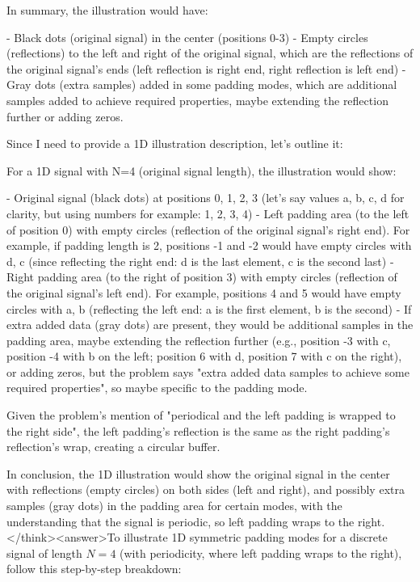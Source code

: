 In summary, the illustration would have:

- Black dots (original signal) in the center (positions 0-3)
- Empty circles (reflections) to the left and right of the original signal, which are the reflections of the original signal's ends (left reflection is right end, right reflection is left end)
- Gray dots (extra samples) added in some padding modes, which are additional samples added to achieve required properties, maybe extending the reflection further or adding zeros.

Since I need to provide a 1D illustration description, let's outline it:

For a 1D signal with N=4 (original signal length), the illustration would show:

- Original signal (black dots) at positions 0, 1, 2, 3 (let's say values a, b, c, d for clarity, but using numbers for example: 1, 2, 3, 4)
- Left padding area (to the left of position 0) with empty circles (reflection of the original signal's right end). For example, if padding length is 2, positions -1 and -2 would have empty circles with d, c (since reflecting the right end: d is the last element, c is the second last)
- Right padding area (to the right of position 3) with empty circles (reflection of the original signal's left end). For example, positions 4 and 5 would have empty circles with a, b (reflecting the left end: a is the first element, b is the second)
- If extra added data (gray dots) are present, they would be additional samples in the padding area, maybe extending the reflection further (e.g., position -3 with c, position -4 with b on the left; position 6 with d, position 7 with c on the right), or adding zeros, but the problem says "extra added data samples to achieve some required properties", so maybe specific to the padding mode.

Given the problem's mention of "periodical and the left padding is wrapped to the right side", the left padding's reflection is the same as the right padding's reflection's wrap, creating a circular buffer.

In conclusion, the 1D illustration would show the original signal in the center with reflections (empty circles) on both sides (left and right), and possibly extra samples (gray dots) in the padding area for certain modes, with the understanding that the signal is periodic, so left padding wraps to the right.</think><answer>To illustrate 1D symmetric padding modes for a discrete signal of length \( N = 4 \) (with periodicity, where left padding wraps to the right), follow this step-by-step breakdown:  


